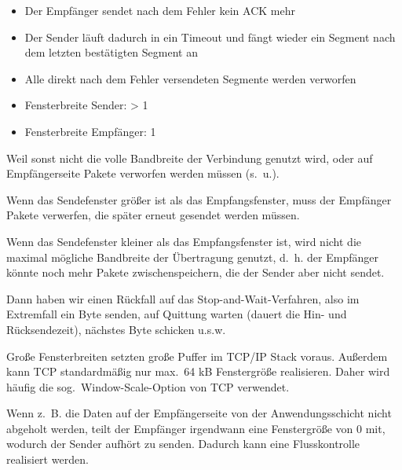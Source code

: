\begin{itemize}
    \item Der Empfänger sendet nach dem Fehler kein ACK mehr
    \item Der Sender läuft dadurch in ein Timeout und fängt wieder ein Segment nach dem letzten bestätigten Segment an
    \item Alle direkt nach dem Fehler versendeten Segmente werden verworfen
\end{itemize}

\begin{itemize}
    \item Fensterbreite Sender: > 1
    \item Fensterbreite Empfänger: 1
\end{itemize}

Weil sonst nicht die volle Bandbreite der Verbindung genutzt wird, oder auf Empfängerseite Pakete verworfen werden müssen (s.\ u.).

Wenn das Sendefenster größer ist als das Empfangsfenster, muss der Empfänger Pakete verwerfen, die später erneut gesendet werden müssen.

Wenn das Sendefenster kleiner als das Empfangsfenster ist, wird nicht die maximal mögliche Bandbreite der Übertragung genutzt,
d.\ h. der Empfänger könnte noch mehr Pakete zwischenspeichern, die der Sender aber nicht sendet.

Dann haben wir einen Rückfall auf das Stop-and-Wait-Verfahren, also im Extremfall ein Byte senden,
auf Quittung warten (dauert die Hin- und Rücksendezeit), nächstes Byte schicken u.s.w.

Große Fensterbreiten setzten große Puffer im TCP/IP Stack voraus.
Außerdem kann TCP standardmäßig nur max.\ 64 kB Fenstergröße realisieren.
Daher wird häufig die sog.\ Window-Scale-Option von TCP verwendet.

Wenn z.\ B. die Daten auf der Empfängerseite von der Anwendungsschicht nicht abgeholt werden, teilt der Empfänger irgendwann eine Fenstergröße von 0 mit, wodurch der Sender aufhört zu senden.
Dadurch kann eine Flusskontrolle realisiert werden.

